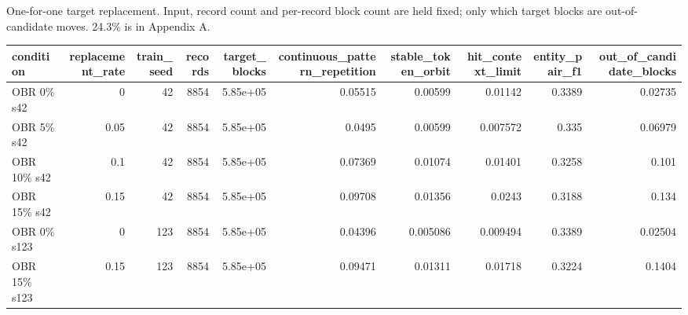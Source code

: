 \caption{One-for-one target replacement. Input, record count and per-record block count are held fixed; only which target blocks are out-of-candidate moves. 24.3\% is in Appendix A.}
\begin{tabular}{lrrrrrrrrr}
\toprule
condition & replacement\_rate & train\_seed & records & target\_blocks & continuous\_pattern\_repetition & stable\_token\_orbit & hit\_context\_limit & entity\_pair\_f1 & out\_of\_candidate\_blocks \\
\midrule
OBR 0\% s42 & 0 & 42 & 8854 & 5.85e+05 & 0.05515 & 0.00599 & 0.01142 & 0.3389 & 0.02735 \\
OBR 5\% s42 & 0.05 & 42 & 8854 & 5.85e+05 & 0.0495 & 0.00599 & 0.007572 & 0.335 & 0.06979 \\
OBR 10\% s42 & 0.1 & 42 & 8854 & 5.85e+05 & 0.07369 & 0.01074 & 0.01401 & 0.3258 & 0.101 \\
OBR 15\% s42 & 0.15 & 42 & 8854 & 5.85e+05 & 0.09708 & 0.01356 & 0.0243 & 0.3188 & 0.134 \\
OBR 0\% s123 & 0 & 123 & 8854 & 5.85e+05 & 0.04396 & 0.005086 & 0.009494 & 0.3389 & 0.02504 \\
OBR 15\% s123 & 0.15 & 123 & 8854 & 5.85e+05 & 0.09471 & 0.01311 & 0.01718 & 0.3224 & 0.1404 \\
\bottomrule
\end{tabular}
